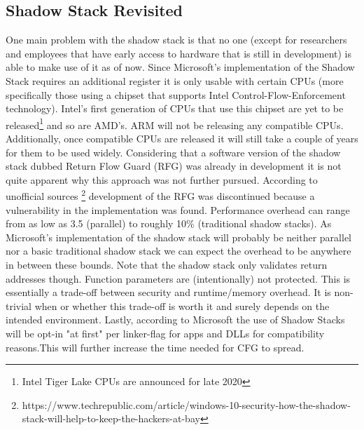 \documentclass[10pt,twocolumn,a4paper]{article}
\begin{document}
\subsection{Shadow Stack Revisited}
One main problem with the shadow stack is that no one (except for researchers and employees that have early access to hardware that is still in development) is able to make use of it as of now. Since Microsoft's implementation of the Shadow Stack requires an additional register it is only usable with certain CPUs (more specifically those using a chipset that supports Intel Control-Flow-Enforcement technology)\cite{CFE}.
Intel's first generation of CPUs that use this chipset are yet to be released\footnote{Intel Tiger Lake CPUs are announced for late 2020} and so are AMD's.
\newline ARM will not be releasing any compatible CPUs\cite{techrepublic}.
Additionally, once compatible CPUs are released it will still take a couple of years for them to be used widely.
Considering that a software version of the shadow stack dubbed Return Flow Guard (RFG)\cite{RFG} was already in development it is not quite apparent why this approach was not further pursued.
According to unofficial sources \footnote{https://www.techrepublic.com/article/windows-10-security-how-the-shadow-stack-will-help-to-keep-the-hackers-at-bay} development of the RFG was discontinued because a vulnerability in the implementation was found.
Performance overhead can range from as low as 3.5 (parallel) to roughly 10\% (traditional shadow stacks)\cite{performance}. As Microsoft's implementation of the shadow stack will probably be neither parallel nor a basic traditional shadow stack we can expect the overhead to be anywhere in between these bounds.
Note that the shadow stack only validates return addresses though. Function parameters are (intentionally) not protected. This is essentially a trade-off between security and runtime/memory overhead. It is non-trivial when or whether this trade-off is worth it and surely depends on the intended environment.
Lastly, according to Microsoft the use of Shadow Stacks will be opt-in "at first" per linker-flag for apps and DLLs for compatibility reasons.This will further increase the time needed for CFG to spread.
\end{document}
